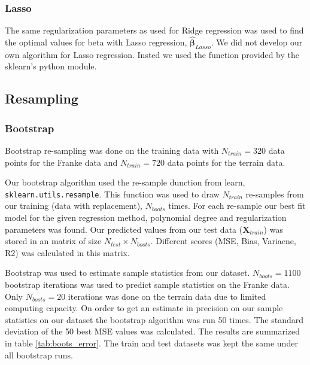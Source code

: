 \subsubsection{Lasso}
The same regularization parameters as used for Ridge regression was used to find the
optimal values for beta with Lasso regression, $\hat{\bm{\beta } } _{Lasso} $. We did not develop our
own algorithm for Lasso regression. Insted we used the function provided by the
sklearn's python module.  

\subsection{Resampling}

\subsubsection{Bootstrap}
Bootstrap re-sampling was done on the training data with $N_{train } = 320$
data points for the Franke data and $N_{train } = 720$ data points for the
terrain data.

Our bootstrap algorithm used the re-sample dunction from learn,
\verb|sklearn.utils.resample|. This function was used to draw $N_{train } $
re-samples from our training (data with replacement), $N_{boots} $ times. For
each re-sample our best fit model for the given regression method, polynomial
degree and regularization parameters was found. Our predicted values from our
test data ($\bm{X} _{train} $) was stored in an matrix of size $N_{test} \times
N_{boots} $. Different scores (MSE, Bias, Variacne, R2) was calculated in this
matrix. 

Bootstrap was used to estimate sample statistics from our dataset. $N_{boots} =
1100$ bootstrap iterations was used to predict sample statistics on the Franke
data. Only $N_{boots} = 20 $ iterations was done on the terrain data due to
limited computing capacity. On order to get an estimate in precision on our
sample statistics on our dataset the bootstrap algorithm was run 50 times. The
standard deviation of the 50 best MSE values was calculated. The results are
summarized in table \ref{tab:boots_error}. The train and test datasets was kept
the same under all bootstrap runs. 


